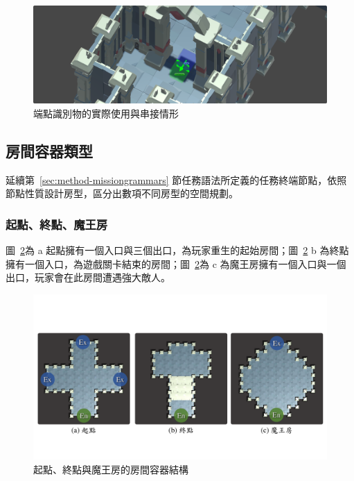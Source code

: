 \begin{figure}[!htb]
  \begin{center}
    \includegraphics[width=1.0\textwidth]{figures/connections-in-volume.png}
    \caption{端點識別物的實際使用與串接情形} 
    \label{fig:connections-in-volume}
  \end{center}
\end{figure}

\subsection{房間容器類型}
\label{ssec:method-spacepieces-types}

延續第~\ref{sec:method-missiongrammars} 節任務語法所定義的任務終端節點，依照節點性質設計房型，區分出數項不同房型的空間規劃。

\subsubsection{起點、終點、魔王房}
\label{sssec:method-spacepieces-types-mainpath-i}

圖~\ref{fig:roomtype-mainpath-i}為 a 起點擁有一個入口與三個出口，為玩家重生的起始房間；圖~\ref{fig:roomtype-mainpath-i} b 為終點擁有一個入口，為遊戲關卡結束的房間；圖~\ref{fig:roomtype-mainpath-i}為 c 為魔王房擁有一個入口與一個出口，玩家會在此房間遭遇強大敵人。

\begin{figure}[!htb]
  \begin{center}
    \includegraphics[width=1.0\textwidth]{figures/roomtype-mainpath-i.pdf}
    \caption{起點、終點與魔王房的房間容器結構}
    \label{fig:roomtype-mainpath-i}
  \end{center}
\end{figure}

